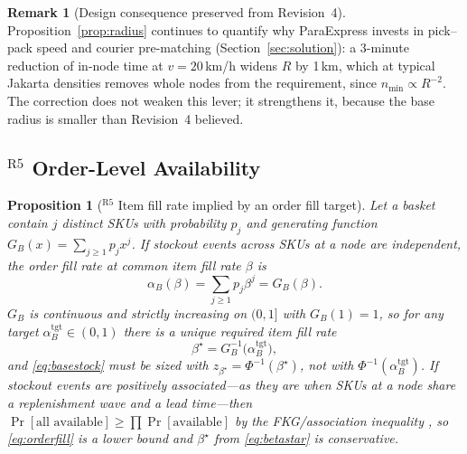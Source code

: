 \documentclass[10pt,twocolumn,letterpaper]{article}
\newtheorem{proposition}{Proposition}
\theoremstyle{definition}
\newtheorem{remark}{Remark}
\begin{document}
\begin{remark}[Design consequence preserved from Revision~4]
Proposition~\ref{prop:radius} continues to quantify why ParaExpress invests in pick--pack speed and courier pre-matching (Section~\ref{sec:solution}): a 3-minute reduction of in-node time at $v=20$\,km/h widens $R$ by 1\,km, which at typical Jakarta densities removes whole nodes from the requirement, since $n_{\min}\propto R^{-2}$. The correction does not weaken this lever; it strengthens it, because the base radius is smaller than Revision~4 believed.
\end{remark}

\subsection{$^{\mathrm{R5}}$ Order-Level Availability}

\begin{proposition}[$^{\mathrm{R5}}$ Item fill rate implied by an order fill target]\label{prop:orderfill}
Let a basket contain $j$ distinct SKUs with probability $p_j$ and generating function $G_B(x)=\sum_{j\ge1}p_jx^{j}$. If stockout events across SKUs at a node are independent, the order fill rate at common item fill rate $\beta$ is
\begin{equation}\label{eq:orderfill}
\alpha_B(\beta)=\sum_{j\ge1}p_j\beta^{j}=G_B(\beta).
\end{equation}
$G_B$ is continuous and strictly increasing on $(0,1]$ with $G_B(1)=1$, so for any target $\alpha_B^{\mathrm{tgt}}\in(0,1)$ there is a unique required item fill rate
\begin{equation}\label{eq:betastar}
\beta^\star=G_B^{-1}\bigl(\alpha_B^{\mathrm{tgt}}\bigr),
\end{equation}
and \eqref{eq:basestock} must be sized with $z_{\beta^\star}=\Phi^{-1}(\beta^\star)$, not with $\Phi^{-1}(\alpha_B^{\mathrm{tgt}})$. If stockout events are positively associated---as they are when SKUs at a node share a replenishment wave and a lead time---then $\Pr[\text{all available}]\ge\prod\Pr[\text{available}]$ by the FKG/association inequality \cite{esary1967}, so \eqref{eq:orderfill} is a lower bound and $\beta^\star$ from \eqref{eq:betastar} is conservative.
\end{proposition}
\end{document}
